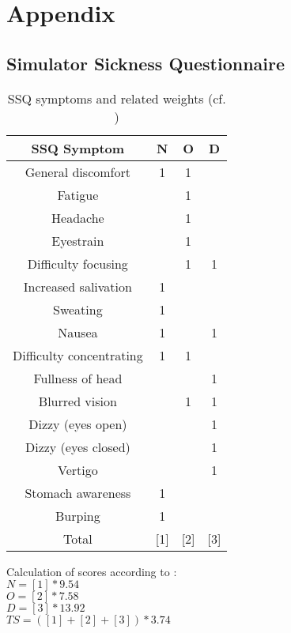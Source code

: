 \chapter[Appendix]{Appendix}

\section{Simulator Sickness Questionnaire} \label{appendix:SSQ}

\begin{table}[!h]
	\centering
	\begin{tabular}{|c|c|c|c|}\hline
		\rowcolor[gray] {.6} \textbf{SSQ Symptom\footnotemark} & \textbf{N} & \textbf{O} & \textbf{D} \\ \hline
		General discomfort & 1 & 1 &  \\ \hline
		Fatigue &  & 1 &  \\ \hline
		Headache &  & 1 &  \\ \hline
		Eyestrain &  & 1 &  \\ \hline
		Difficulty focusing &  & 1 & 1 \\ \hline
		Increased salivation & 1 &  &  \\ \hline
		Sweating & 1 &  &  \\ \hline
		Nausea & 1 &  & 1 \\ \hline
		Difficulty concentrating & 1 & 1 &  \\ \hline
		Fullness of head &  &  & 1 \\ \hline
		Blurred vision &  & 1 & 1 \\ \hline
		Dizzy (eyes open) &  &  & 1 \\ \hline
		Dizzy (eyes closed) &  &  & 1 \\ \hline
		Vertigo &  &  & 1 \\ \hline
		Stomach awareness & 1 &  &  \\ \hline
		Burping & 1 &  &  \\ \hline \hline
		Total\footnotemark & [1] & [2] & [3] \\ \hline
	\end{tabular}
	\caption{SSQ symptoms and related weights (cf. \cite[p. 212]{kennedy1993simulator})}
	\label{table:SSQ_symptoms_weights}
\end{table}
\noindent Calculation of scores according to \cite[p. 212]{kennedy1993simulator}: \\
$N=[1]*9.54$\\
$O=[2]*7.58$\\
$D=[3]*13.92$\\
$TS=([1]+[2]+[3])*3.74$
\newpage

